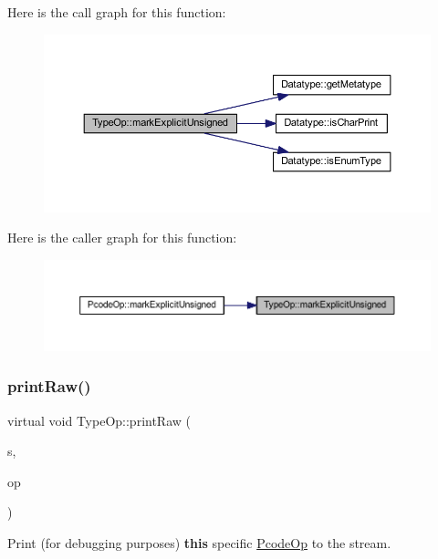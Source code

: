 Here is the call graph for this function\+:
\nopagebreak
\begin{figure}[H]
\begin{center}
\leavevmode
\includegraphics[width=350pt]{class_type_op_a490abb4596b7ddc78c5afc40a6326701_cgraph}
\end{center}
\end{figure}
Here is the caller graph for this function\+:
\nopagebreak
\begin{figure}[H]
\begin{center}
\leavevmode
\includegraphics[width=350pt]{class_type_op_a490abb4596b7ddc78c5afc40a6326701_icgraph}
\end{center}
\end{figure}
\mbox{\label{class_type_op_a60717e486917a30cc7cb6e3ce02585e1}} 
\subsubsection{\texorpdfstring{printRaw()}{printRaw()}}
{\footnotesize\ttfamily virtual void Type\+Op\+::print\+Raw (\begin{DoxyParamCaption}\item[{ostream \&}]{s,  }\item[{const \mbox{\hyperlink{class_pcode_op}{Pcode\+Op}} $\ast$}]{op }\end{DoxyParamCaption})\hspace{0.3cm}{\ttfamily [pure virtual]}}



Print (for debugging purposes) {\bfseries{this}} specific \mbox{\hyperlink{class_pcode_op}{Pcode\+Op}} to the stream. 


